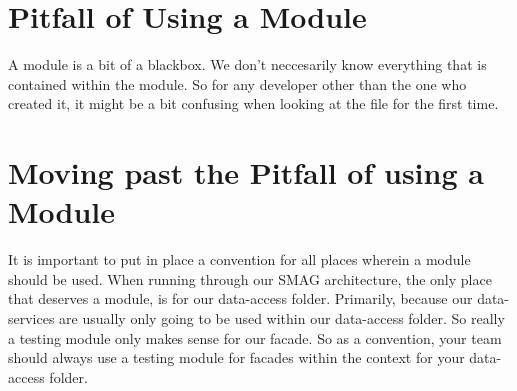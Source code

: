 \section{Pitfall of Using a Module}
A module is a bit of a blackbox. We don't neccesarily know everything that is
contained within the module. So for any developer other than the one who
created it, it might be a bit confusing when looking at the file for the first
time.

\section{Moving past the Pitfall of using a Module}
It is important to put in place a convention for all places wherein a module
should be used. When running through our SMAG architecture, the only place that
deserves a module, is for our data-access folder. Primarily, because our
data-services are usually only going to be used within our data-access folder.
So really a testing module only makes sense for our facade. So as a convention,
your team should always use a testing module for facades within the context for
your data-access folder.
